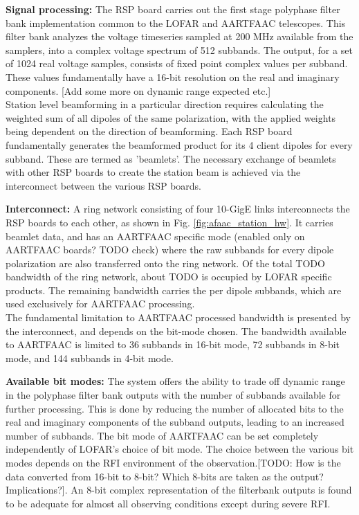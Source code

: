 \documentclass{aa}
\begin{document}
\textbf {Signal processing:} The RSP board  carries out the first stage polyphase
filter bank  implementation common  to the LOFAR  and AARTFAAC  telescopes. This
filter bank  analyzes the voltage timeseries  sampled at 200 MHz  available from
the samplers, into a complex voltage spectrum of 512 subbands. The output, for a
set of  1024 real voltage  samples, consists of  fixed point complex  values per
subband. These  values fundamentally have  a 16-bit  resolution on the  real and
imaginary components. [Add some more on dynamic range expected etc.]\\

Station level  beamforming in  a particular  direction requires  calculating the
weighted sum of  all dipoles of the same polarization,  with the applied weights
being dependent on  the direction of beamforming.  Each  RSP board fundamentally
generates the  beamformed product for  its 4  client dipoles for  every subband.
These are termed  as 'beamlets'.  The necessary exchange of  beamlets with other
RSP boards to  create the station beam is achieved  via the interconnect between
the various RSP boards.

\textbf  {Interconnect:}  A  ring  network   consisting  of  four  10-GigE  links
interconnects    the    RSP   boards    to    each    other,   as    shown    in
Fig. \ref{fig:afaac_station_hw}.  It carries beamlet  data, and has  an AARTFAAC
specific  mode (enabled  only  on AARTFAAC  boards? TODO  check)  where the  raw
subbands  for every  dipole  polarization  are also  transferred  onto the  ring
network. Of the total TODO bandwidth of the ring network, about TODO is occupied
by  LOFAR specific  products. The  remaining  bandwidth carries  the per  dipole
subbands, which are used exclusively for AARTFAAC processing.\\ 

The fundamental limitation  to AARTFAAC processed bandwidth is  presented by the
interconnect, and  depends on  the bit-mode chosen.  The bandwidth  available to
AARTFAAC is limited  to 36 subbands in  16-bit mode, 72 subbands  in 8-bit mode,
and 144 subbands in 4-bit mode.

\textbf  {Available bit  modes:}  The system  offers the  ability  to trade  off
dynamic range in  the polyphase filter bank outputs with  the number of subbands
available  for further  processing.  This  is done  by  reducing  the number  of
allocated bits  to the  real and  imaginary components  of the  subband outputs,
leading to an increased number of subbands.  The bit mode of AARTFAAC can be set
completely independently of  LOFAR's choice of bit mode. The  choice between the
various bit modes  depends on the RFI environment of  the observation.[TODO: How
  is the  data converted  from 16-bit to  8-bit? Which 8-bits  are taken  as the
  output?  Implications?].  An  8-bit complex  representation of  the filterbank
outputs  is found  to be  adequate for  almost all  observing conditions  except
during severe RFI.
\end{document}
